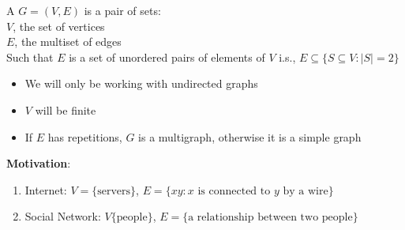 \documentclass[11pt]{scrartcl}
\begin{document}
\begin{definition}
    A  $G = (V, E)$ is a pair of sets: \\
        $V$, the set of vertices\\
        $E$, the multiset of edges\\
        Such that $E$ is a set of unordered pairs of elements of $V$ i.s., $E \subseteq\{S \subseteq V: |S| = 2\}$
\end{definition}
\begin{remark}
    \begin{itemize}
        \item We will only be working with undirected graphs
        \item $V$ will be finite
        \item If $E$ has repetitions, $G$ is a multigraph, otherwise it is a simple graph
    \end{itemize}
\end{remark}
\begin{motivation}
\textbf{Motivation}:
    \begin{enumerate}
        \item Internet: $V = \{\text{servers}\}$, $E = \{xy: x \text{ is connected to $y$ by a wire}\}$
        \item Social Network: $V\{\text{people}\}$, $E = \{\text{a relationship between two people}\}$
    \end{enumerate}
\end{motivation}
\end{document}
